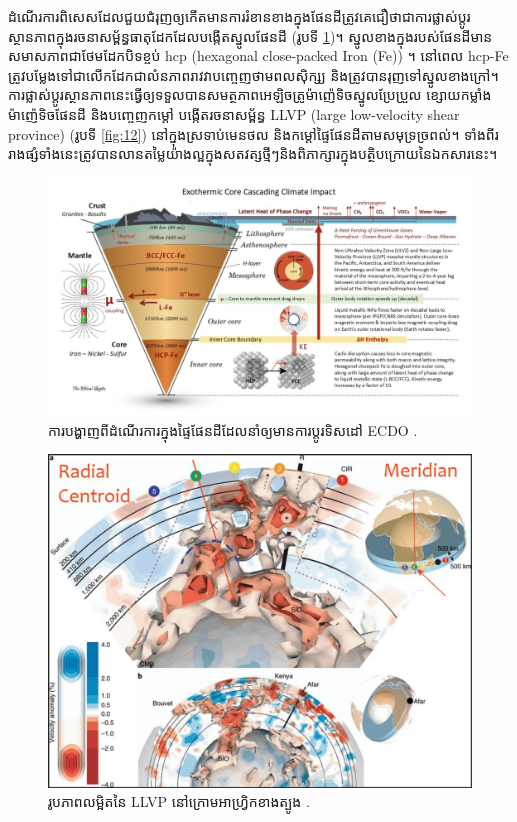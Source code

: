 \documentclass[10pt,twocolumn,letterpaper]{article}
\begin{document}
ដំណើរការពិសេសដែលជួយជំរុញឲ្យកើតមានការរំខានខាងក្នុងផែនដីត្រូវគេជឿថាជាការផ្លាស់ប្តូរស្ថានភាពក្នុងរចនាសម្ព័ន្ធធាតុដែកដែលបង្កើតស្នូលផែនដី (រូបទី \ref{fig:11})។ ស្នូលខាងក្នុងរបស់ផែនដីមានសមាសភាពជាថែមដែកបិទខ្ចប់ hcp (hexagonal close-packed Iron (Fe)) \cite{141}។ នៅពេល hcp-Fe ត្រូវបម្លែងទៅជាលើកដែកជាលំនភាពរាវវាបញ្ចេញថាមពលសុិក្ស្យ និងត្រូវបានរុញទៅស្នូលខាងក្រៅ។ ការផ្លាស់ប្តូរស្ថានភាពនេះធ្វើឲ្យទទួលបានសមត្ថភាពអេឡិចត្រូម៉ាញ៉េទិចស្នូលប្រែប្រួល ខ្សោយកម្លាំងម៉ាញ៉េទិចផែនដី និងបញ្ចេញកម្តៅ បង្កើតរចនាសម្ព័ន្ធ LLVP (large low-velocity shear province) (រូបទី \ref{fig:12}) \cite{38} នៅក្នុងស្រទាប់មេនថល និងកម្តៅផ្ទៃផែនដីតាមសមុទ្រច្រពល់។ ទាំងពីររាងផ្សំទាំងនេះត្រូវបានលានតម្លៃយ៉ាងល្អក្នុងសតវត្សថ្មីៗនិងពិភាក្សារក្នុងបត្ថិបក្រោយនៃឯកសារនេះ។

\begin{figure}[t]
\begin{center}
\includegraphics[width=1\textwidth]{layers.jpg}
\end{center}
   \caption{ការបង្ហាញពីដំណើរការ​ក្នុងផ្ទៃផែនដី​ដែលនាំឲ្យមានការប្ដូរទិសដៅ ECDO \cite{129}.}
\label{fig:11}
\end{figure}


\begin{figure}[t]
\begin{center}
   \includegraphics[width=1\linewidth]{llvp.jpg}
\end{center}
   \caption{រូបភាពលម្អិតនៃ LLVP នៅក្រោមអាហ្វ្រិកខាងត្បូង \cite{28}.}
\label{fig:12}
\label{fig:onecol}
\end{figure}
\end{document}
